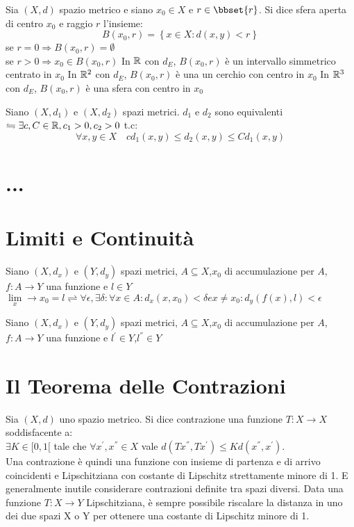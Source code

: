 Sia $(X,d)$ spazio metrico e siano $x_0\in X$ e $r\in\bbset{r}$. Si dice sfera aperta di centro $x_0$ e raggio $r$ l'insieme:
$$B(x_0,r)=\left\{ x\in X : d(x,y)<r  \right\}$$
\observation
se $r=0\Rightarrow B(x_0,r)=\emptyset$\\
se $r>0\Rightarrow x_0\in B(x_0,r)$
\example
In $\mathbb{R}$ con $d_E$, $B(x_0,r)$ è un intervallo simmetrico centrato in $x_0$
\example
In $\mathbb{R}^{2}$ con $d_E$, $B(x_0,r)$ è una un cerchio con centro in $x_0$
\example
In $\mathbb{R}^{3}$ con $d_E$, $B(x_0,r)$ è una sfera con centro in $x_0$
\example
\example

Siano $(X,d_1)$ e $(X,d_2)$ spazi metrici. $d_1$ e $d_2$ sono equivalenti $\leftrightharpoons \exists c,C\in\mathbb{R}, c_1>0, c_2>0$ t.c:
$$ \forall x,y \in X\quad cd_1(x,y)\le d_2(x,y)\le Cd_1(x,y) $$


\section{...}
\section{Limiti e Continuità}
Siano $(X,d_x)$ e $(Y,d_y)$ spazi metrici, $A\subseteq{X}$,$x_0$ di accumulazione per $A$, $f:A\rightarrow{Y}$ una funzione e $l\in{Y}$ \\
$\lim\limits_x\rightarrow{x_0} = l \rightleftharpoons \forall{\epsilon},\exists\delta : \forall{x}\in A : d_x(x,x_0)<\delta e x\ne{x_0} : d_y(f(x),l)<\epsilon$

\proposition
Siano $(X,d_x)$ e $(Y,d_y)$ spazi metrici, $A\subseteq{X}$,$x_0$ di accumulazione per $A$, $f:A\rightarrow{Y}$ una funzione e $l^{'}\in{Y}$,$l^{''}\in{Y}$  \\

\section{Il Teorema delle Contrazioni}
Sia $(X, d)$ uno spazio metrico. Si dice contrazione una funzione
$T: X \rightarrow X$ soddisfacente a:\\

$\exists K \in [0, 1[ $ tale che $\forall x^{'},x^{''}\in X$ vale
$d(Tx^{''}, T x^{'})\le Kd(x^{''}, x^{'}).$\\


Una contrazione è quindi una funzione con insieme di partenza e di arrivo coincidenti e
Lipschitziana con costante di Lipschitz strettamente minore di 1.
E generalmente inutile considerare contrazioni definite tra spazi diversi. Data una funzione
$T: X\rightarrow Y$ Lipschitziana, è sempre possibile riscalare la distanza in uno dei due spazi X o Y
per ottenere una costante di Lipschitz minore di 1.

